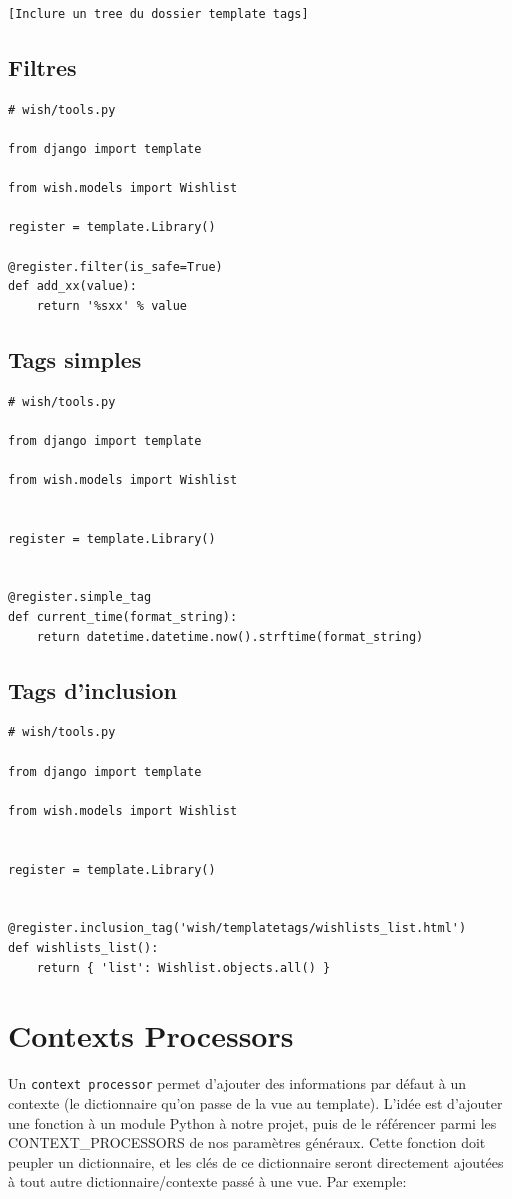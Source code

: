 \documentclass[11pt]{amsbook}
\begin{document}
\begin{verbatim}
[Inclure un tree du dossier template tags]
\end{verbatim}

\hypertarget{x-filtres}{\subsection{Filtres}}
\begin{verbatim}
# wish/tools.py

from django import template

from wish.models import Wishlist

register = template.Library()

@register.filter(is_safe=True)
def add_xx(value):
    return '%sxx' % value
\end{verbatim}

\hypertarget{x-tags-simples}{\subsection{Tags simples}}
\begin{verbatim}
# wish/tools.py

from django import template

from wish.models import Wishlist


register = template.Library()


@register.simple_tag
def current_time(format_string):
    return datetime.datetime.now().strftime(format_string)
\end{verbatim}

\hypertarget{x-tags-d’inclusion}{\subsection{Tags d’inclusion}}
\begin{verbatim}
# wish/tools.py

from django import template

from wish.models import Wishlist


register = template.Library()


@register.inclusion_tag('wish/templatetags/wishlists_list.html')
def wishlists_list():
    return { 'list': Wishlist.objects.all() }
\end{verbatim}

\hypertarget{x-contexts-processors}{\section{Contexts Processors}}
Un \texttt{context processor} permet d’ajouter des informations par défaut à un contexte (le dictionnaire qu’on passe de la vue au template).
L’idée est d’ajouter une fonction à un module Python à notre projet, puis de le référencer parmi
  les CONTEXT\_PROCESSORS de nos paramètres généraux. Cette fonction doit peupler un dictionnaire, et les clés de ce dictionnaire seront
  directement ajoutées à tout autre dictionnaire/contexte passé à une vue. Par exemple:
\end{document}
